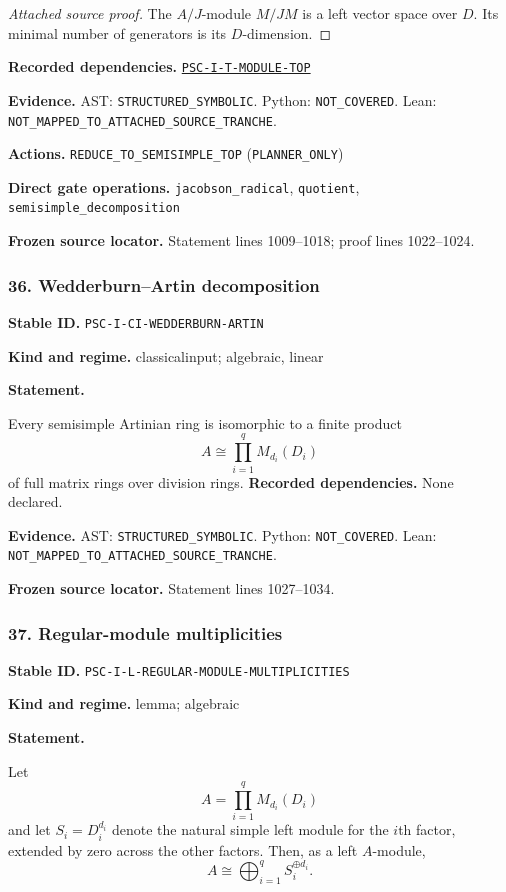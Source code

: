 \documentclass[a4paper,11pt]{article}
\newcommand{\field}[2]{\noindent\textbf{#1.} #2\par}
\begin{document}
\begin{proof}[Attached source proof]
The $A/J$-module $M/JM$ is a left vector space over $D$.  Its minimal number of generators is its $D$-dimension.
\end{proof}
\field{Recorded dependencies}{\hyperref[rec:PSC-I-T-MODULE-TOP]{\nolinkurl{PSC-I-T-MODULE-TOP}}}
\field{Evidence}{AST: \nolinkurl{STRUCTURED_SYMBOLIC}. Python: \nolinkurl{NOT_COVERED}. Lean: \nolinkurl{NOT_MAPPED_TO_ATTACHED_SOURCE_TRANCHE}.}
\field{Actions}{\nolinkurl{REDUCE_TO_SEMISIMPLE_TOP} (\nolinkurl{PLANNER_ONLY})}
\field{Direct gate operations}{\nolinkurl{jacobson_radical}, \nolinkurl{quotient}, \nolinkurl{semisimple_decomposition}}
\field{Frozen source locator}{Statement lines 1009--1018; proof lines 1022--1024.}
\subsubsection*{36. Wedderburn--Artin decomposition}
\label{rec:PSC-I-CI-WEDDERBURN-ARTIN}
\field{Stable ID}{\nolinkurl{PSC-I-CI-WEDDERBURN-ARTIN}}
\field{Kind and regime}{classicalinput; algebraic, linear}
\textbf{Statement.}\par
Every semisimple Artinian ring is isomorphic to a finite product
\[
A\cong\prod_{i=1}^{q}M_{d_i}(D_i)
\]
of full matrix rings over division rings.
\field{Recorded dependencies}{None declared.}
\field{Evidence}{AST: \nolinkurl{STRUCTURED_SYMBOLIC}. Python: \nolinkurl{NOT_COVERED}. Lean: \nolinkurl{NOT_MAPPED_TO_ATTACHED_SOURCE_TRANCHE}.}
\field{Frozen source locator}{Statement lines 1027--1034.}
\subsubsection*{37. Regular-module multiplicities}
\label{rec:PSC-I-L-REGULAR-MODULE-MULTIPLICITIES}
\field{Stable ID}{\nolinkurl{PSC-I-L-REGULAR-MODULE-MULTIPLICITIES}}
\field{Kind and regime}{lemma; algebraic}
\textbf{Statement.}\par
Let
\[
A=\prod_{i=1}^{q}M_{d_i}(D_i)
\]
and let $S_i=D_i^{d_i}$ denote the natural simple left module for the $i$th factor, extended by zero across the other factors.  Then, as a left $A$-module,
\[
\boxed{A\cong\bigoplus_{i=1}^{q}S_i^{\oplus d_i}.}
\]
\end{document}
